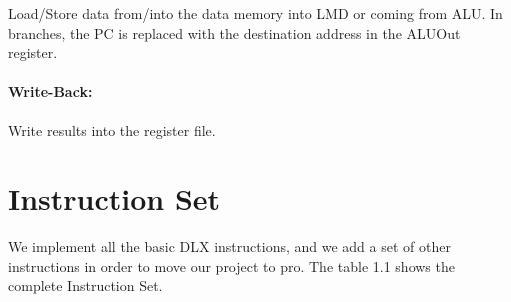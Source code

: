 Load/Store data from/into the data memory into LMD or coming from ALU. In branches, the PC is replaced with the destination
address in the ALUOut register.  

\paragraph{Write-Back:}
	
Write results into the register file.


\section{Instruction Set}

We implement all the basic DLX instructions, and we add a set of other instructions in order to move our project to pro. The table
1.1 shows the complete Instruction Set.						 



